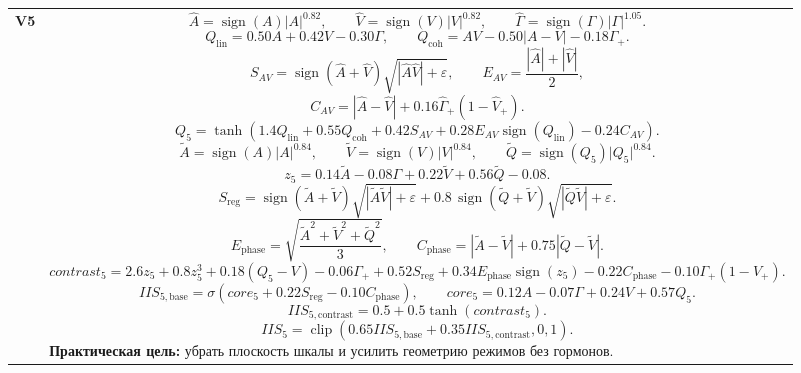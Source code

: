 \documentclass[12pt,a4paper]{article}
\newcommand{\sgn}{\operatorname{sign}}
\newcommand{\clip}{\operatorname{clip}}
\newcommand{\spow}[2]{\sgn(#1)\lvert #1 \rvert^{#2}}
\begin{document}
\begin{landscape}
\begin{longtable}{>{\raggedright\arraybackslash}p{1.6cm} >{\raggedright\arraybackslash}p{16.7cm}}
\textbf{V5} &
\[
\widehat{A}=\spow{A}{0.82},\qquad
\widehat{V}=\spow{V}{0.82},\qquad
\widehat{\Gamma}=\spow{\Gamma}{1.05}.
\]
\[
Q_{\mathrm{lin}}=0.50A+0.42V-0.30\Gamma,
\qquad
Q_{\mathrm{coh}}=AV-0.50|A-V|-0.18\Gamma_+.
\]
\[
S_{AV}=\sgn(\widehat{A}+\widehat{V})\sqrt{|\widehat{A}\widehat{V}|+\varepsilon},
\qquad
E_{AV}=\frac{|\widehat{A}|+|\widehat{V}|}{2},
\]
\[
C_{AV}=|\widehat{A}-\widehat{V}|+0.16\widehat{\Gamma}_+(1-\widehat{V}_+).
\]
\[
Q_5=\tanh\!\left(
1.4Q_{\mathrm{lin}}+0.55Q_{\mathrm{coh}}+0.42S_{AV}+0.28E_{AV}\sgn(Q_{\mathrm{lin}})-0.24C_{AV}
\right).
\]
\[
\widetilde{A}=\spow{A}{0.84},\qquad
\widetilde{V}=\spow{V}{0.84},\qquad
\widetilde{Q}=\spow{Q_5}{0.84}.
\]
\[
z_5=0.14\widetilde{A}-0.08\Gamma+0.22\widetilde{V}+0.56\widetilde{Q}-0.08.
\]
\[
S_{\mathrm{reg}}=
\sgn(\widetilde{A}+\widetilde{V})\sqrt{|\widetilde{A}\widetilde{V}|+\varepsilon}
+0.8\,\sgn(\widetilde{Q}+\widetilde{V})\sqrt{|\widetilde{Q}\widetilde{V}|+\varepsilon}.
\]
\[
E_{\mathrm{phase}}=\sqrt{\frac{\widetilde{A}^2+\widetilde{V}^2+\widetilde{Q}^2}{3}},
\qquad
C_{\mathrm{phase}}=|\widetilde{A}-\widetilde{V}|+0.75|\widetilde{Q}-\widetilde{V}|.
\]
\[
contrast_5=
2.6z_5+0.8z_5^3+0.18(Q_5-V)-0.06\Gamma_+
+0.52S_{\mathrm{reg}}+0.34E_{\mathrm{phase}}\sgn(z_5)-0.22C_{\mathrm{phase}}-0.10\Gamma_+(1-V_+).
\]
\[
IIS_{5,\mathrm{base}}=\sigma\!\left(core_5+0.22S_{\mathrm{reg}}-0.10C_{\mathrm{phase}}\right),
\qquad
core_5=0.12A-0.07\Gamma+0.24V+0.57Q_5.
\]
\[
IIS_{5,\mathrm{contrast}}=0.5+0.5\tanh(contrast_5).
\]
\[
IIS_5=\clip\!\left(0.65IIS_{5,\mathrm{base}}+0.35IIS_{5,\mathrm{contrast}},0,1\right).
\]
\textbf{Практическая цель:} убрать плоскость шкалы и усилить геометрию режимов без гормонов. \\


\end{longtable}
\end{landscape}
\end{document}

